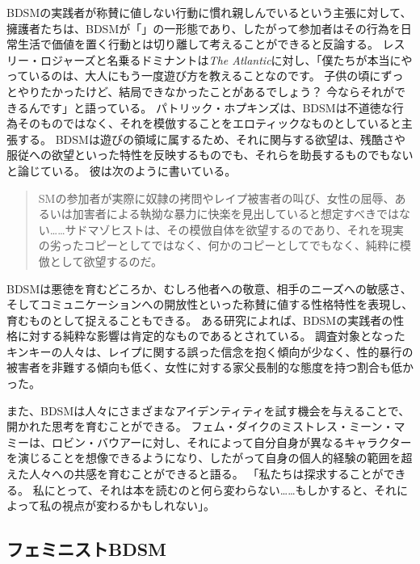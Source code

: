 \documentclass[paper=a4,book,openany]{jlreq} \usepackage{mystyle}
\begin{document}
BDSMの実践者が称賛に値しない行動に慣れ親しんでいるという主張に対して、擁護者たちは、BDSMが「」の一形態であり、したがって参加者はその行為を日常生活で価値を置く行動とは切り離して考えることができると反論する。
レスリー・ロジャーズと名乗るドミナントは\emph{The Atlantic}に対し、「僕たちが本当にやっているのは、大人にもう一度遊び方を教えることなのです。
子供の頃にずっとやりたかったけど、結局できなかったことがあるでしょう？ 今ならそれができるんです」と語っている\citep{morin15:_that_time_i_tried_bdsm_therap}。
パトリック・ホプキンズは、BDSMは不道徳な行為そのものではなく、それを模倣することをエロティックなものとしていると主張する。
BDSMは遊びの領域に属するため、それに関与する欲望は、残酷さや服従への欲望といった特性を反映するものでも、それらを助長するものでもないと論じている。
彼は次のように書いている。

\begin{quote}
  SMの参加者が実際に奴隷の拷問やレイプ被害者の叫び、女性の屈辱、あるいは加害者による執拗な暴力に快楽を見出していると想定すべきではない……サドマゾヒストは、その模倣自体を欲望するのであり、それを現実の劣ったコピーとしてではなく、何かのコピーとしてでもなく、純粋に模倣として欲望するのだ。
\citep[p.125]{hopkins94:_rethin_sadom}

\end{quote}

BDSMは悪徳を育むどころか、むしろ他者への敬意、相手のニーズへの敏感さ、そしてコミュニケーションへの開放性といった称賛に値する性格特性を表現し、育むものとして捉えることもできる。
ある研究によれば、BDSMの実践者の性格に対する純粋な影響は肯定的なものであるとされている。
調査対象となったキンキーの人々は、レイプに関する誤った信念を抱く傾向が少なく、性的暴行の被害者を非難する傾向も低く、女性に対する家父長制的な態度を持つ割合も低かった\citep[p.1]{klement16:_partic_cultur_consen_may_be}。

また、BDSMは人々にさまざまなアイデンティティを試す機会を与えることで、開かれた思考を育むことができる。
フェム・ダイクのミストレス・ミーン・マミーは、ロビン・バウアーに対し、それによって自分自身が異なるキャラクターを演じることを想像できるようになり、したがって自身の個人的経験の範囲を超えた人々への共感を育むことができると語る。
「私たちは探求することができる。
私にとって、それは本を読むのと何ら変わらない……もしかすると、それによって私の視点が変わるかもしれない」\citep[p.141]{bauer18:_bois_grrrl_meet_their_daddies}。

\subsection{フェミニストBDSM}
\end{document}
